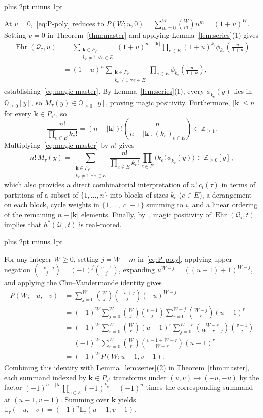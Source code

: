 \documentclass[11pt,letterpaper]{article}
\makeatletter
\renewenvironment{proof}[1][\proofname]{%
  \par\pushQED{\qed}\normalfont
  \topsep9pt plus 2pt minus 1pt\relax
  \trivlist\item[\hskip\labelsep\itshape #1\@addpunct{.}]\ignorespaces
}{\popQED\endtrivlist\@endpefalse}
\theoremstyle{result}
\theoremstyle{definition}
\theoremstyle{remark}
\newcommand{\ZZ}{\mathbb{Z}}
\newcommand{\QQ}{\mathbb{Q}}
\newcommand{\biE}{\mathbb{E}}
\newcommand{\qQ}{\mathcal{Q}}
\newcommand{\Ehr}{\operatorname{Ehr}}
\makeatother
\begin{document}
\begin{proof}[Proof of Corollary~\ref{cor:magic}]
At $v=0$,~\eqref{eq:P-poly} reduces to $P(W; u, 0)=\sum_{m=0}^W\binom{W}{m}u^m=(1+u)^W$. Setting $v=0$ in Theorem~\ref{thm:master} and applying Lemma~\ref{lem:series}(1) gives
\begin{align*}
\Ehr(\qQ_\tau, u)
&= \sum_{\substack{\mathbf{k}\in P_{\tau^*} \\ k_e\ne 1 \;\forall e\in E}} (1+u)^{n-|\mathbf{k}|}\prod_{e\in E}(1+u)^{k_e}\phi_{k_e}\!\left(\frac{u}{1+u}\right) \\
&= (1+u)^n \sum_{\substack{\mathbf{k}\in P_{\tau^*} \\ k_e\ne 1 \;\forall e\in E}} \prod_{e\in E}\phi_{k_e}\!\left(\frac{u}{1+u}\right),
\end{align*}
establishing~\eqref{eq:magic-master}. By Lemma~\ref{lem:series}(1), every $\phi_{k_e}(y)$ lies in $\QQ_{\ge 0}[y]$, so $M_\tau(y)\in\QQ_{\ge 0}[y]$, proving magic positivity. Furthermore, $|\mathbf{k}|\le n$ for every $\mathbf{k}\in P_{\tau^*}$, so
\[
\frac{n!}{\prod_{e\in E} k_e!}
=(n-|\mathbf{k}|)!\binom{n}{n-|\mathbf{k}|,(k_e)_{e\in E}}
\in\ZZ_{\ge 1}.
\]
Multiplying~\eqref{eq:magic-master} by $n!$ gives
\[
n!\,M_\tau(y) = \sum_{\substack{\mathbf{k}\in P_{\tau^*} \\ k_e\ne 1 \;\forall e\in E}} \frac{n!}{\prod_{e\in E} k_e!}\prod_{e\in E}\bigl(k_e!\,\phi_{k_e}(y)\bigr) \in \ZZ_{\ge 0}[y],
\]
which also provides a direct combinatorial interpretation of $n!\,c_i(\tau)$ in terms of partitions of a subset of $\{1,\dots,n\}$ into blocks of sizes $k_e$ ($e\in E$), a derangement on each block, cycle weights in $\{1,\dots,|c|-1\}$ summing to $i$, and a linear ordering of the remaining $n-|\mathbf{k}|$ elements. Finally, by~\cite[Theorem~4.2]{Bra06}, magic positivity of $\Ehr(\qQ_\tau, t)$ implies that $h^*(\qQ_\tau, t)$ is real-rooted.
\end{proof}

\begin{proof}[Proof of Corollary~\ref{cor:double}]
For any integer $W\ge 0$, setting $j=W-m$ in~\eqref{eq:P-poly}, applying upper negation $\binom{-v+j}{j}=(-1)^j\binom{v-1}{j}$, expanding $u^{W-j}=((u-1)+1)^{W-j}$, and applying the Chu--Vandermonde identity gives
\begin{align*}
P(W; -u, -v)
&= \sum_{j=0}^{W} \binom{W}{j}\binom{-v+j}{j}(-u)^{W-j} \\
&= (-1)^W \sum_{j=0}^{W} \binom{W}{j}\binom{v-1}{j} \sum_{r=0}^{W-j}\binom{W-j}{r}(u-1)^r \\
&= (-1)^W \sum_{r=0}^{W}\binom{W}{r}(u-1)^r \sum_{j=0}^{W-r}\binom{W-r}{W-r-j}\binom{v-1}{j} \\
&= (-1)^W \sum_{r=0}^{W}\binom{W}{r}\binom{v-1+W-r}{W-r}(u-1)^r\\
&= (-1)^W P(W; u-1, v-1).
\end{align*}
Combining this identity with Lemma~\ref{lem:series}(2) in Theorem~\ref{thm:master}, each summand indexed by $\mathbf{k}\in P_{\tau^*}$ transforms under $(u,v)\mapsto(-u,-v)$ by the factor $(-1)^{n-|\mathbf{k}|}\prod_{e\in E}(-1)^{k_e}=(-1)^n$ times the corresponding summand at $(u-1,v-1)$. Summing over $\mathbf{k}$ yields $\biE_\tau(-u,-v)=(-1)^n\biE_\tau(u-1,v-1)$.
\end{proof}
\end{document}
